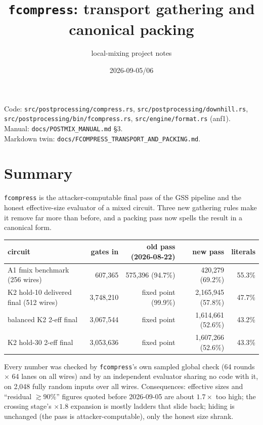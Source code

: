 \documentclass[11pt]{article}
\title{\texttt{fcompress}: transport gathering and canonical packing}
\author{local-mixing project notes}
\date{2026-09-05/06}
\begin{document}
\maketitle

\noindent Code: \texttt{src/postprocessing/compress.rs}, \texttt{src/postprocessing/downhill.rs},\\
\texttt{src/postprocessing/bin/fcompress.rs}, \texttt{src/engine/format.rs} (anf1).\\
Manual: \texttt{docs/POSTMIX\_MANUAL.md} \S3.\\
Markdown twin: \texttt{docs/FCOMPRESS\_TRANSPORT\_AND\_PACKING.md}.

\section{Summary}

\texttt{fcompress} is the attacker-computable final pass of the GSS pipeline and the honest
effective-size evaluator of a mixed circuit. Three new gathering rules make it remove far more
than before, and a packing pass now spells the result in a canonical form.

\begin{center}\small
\begin{tabular}{lrrrr}\toprule
circuit & gates in & old pass (2026-08-22) & new pass & literals\\\midrule
A1 fmix benchmark (256 wires) & 607,365 & 575,396 (94.7\%) & 420,279 (69.2\%) & 55.3\%\\
K2 hold-10 delivered final (512 wires) & 3,748,210 & fixed point (99.9\%) & 2,165,945 (57.8\%) & 47.7\%\\
balanced K2 2-eff final & 3,067,544 & fixed point & 1,614,661 (52.6\%) & 43.2\%\\
K2 hold-30 2-eff final & 3,053,636 & fixed point & 1,607,266 (52.6\%) & 43.3\%\\
\bottomrule\end{tabular}
\end{center}

Every number was checked by \texttt{fcompress}'s own sampled global check (64 rounds $\times$ 64
lanes on all wires) and by an independent evaluator sharing no code with it, on 2,048 fully
random inputs over all wires. Consequences: effective sizes and ``residual $\gtrsim 90\%$''
figures quoted before 2026-09-05 are about $1.7\times$ too high; the crossing stage's
$\times 1.8$ expansion is mostly ladders that slide back; hiding is unchanged (the pass is
attacker-computable), only the honest size shrank.
\end{document}
